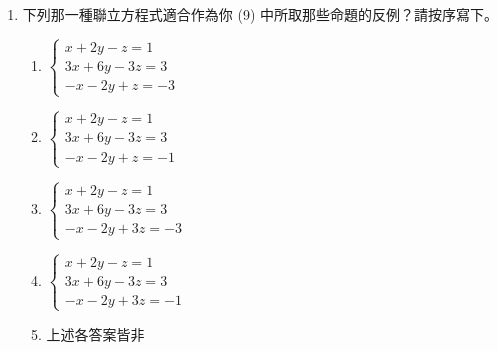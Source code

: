\begin{enumerate}[label=(\arabic*), resume, leftmargin=2em]
  \begin{center}
  \end{center}

  可作為 (8) 中那幾命題的反例？\\
  \textbf{注意：}(9) 錯則 (10) 不給分。

  \item 下列那一種聯立方程式適合作為你 (9) 中所取那些命題的反例？請按序寫下。
  \begin{enumerate}[label=\textcircled{\arabic*}, leftmargin=2em]
    \item $\begin{cases} x + 2y - z = 1 \\ 3x + 6y - 3z = 3 \\ -x - 2y + z = -3 \end{cases}$
    \item $\begin{cases} x + 2y - z = 1 \\ 3x + 6y - 3z = 3 \\ -x - 2y + z = -1 \end{cases}$
    \item $\begin{cases} x + 2y - z = 1 \\ 3x + 6y - 3z = 3 \\ -x - 2y + 3z = -3 \end{cases}$
    \item $\begin{cases} x + 2y - z = 1 \\ 3x + 6y - 3z = 3 \\ -x - 2y + 3z = -1 \end{cases}$
    \item 上述各答案皆非
  \end{enumerate}
\end{enumerate}
